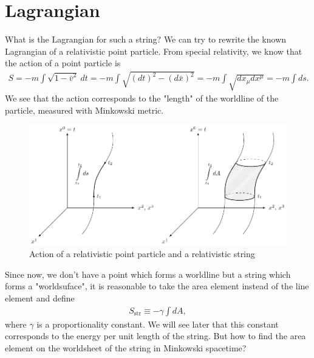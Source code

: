 \section{Lagrangian}
What is the Lagrangian for such a string? 
We can try to rewrite the known Lagrangian of a relativistic point particle.
From special relativity, we know that the action of a point particle is 
\begin{align}
S = - m \int \sqrt{1 - \bar{v}^2} \ dt = - m \int \sqrt{(dt)^2 - (d\bar{x})^2} = - m \int \sqrt{dx_{\mu}dx^{\mu}} = - m \int ds. 
\end{align}
We see that the action corresponds to the "length" of the worldline of the particle, measured with Minkowski metric.
\begin{figure}[H]
\begin{center}
\includegraphics[width=\textwidth]{img/string_action.pdf}
\end{center}
\caption{Action of a relativistic point particle and a relativistic string}
\label{fig:9}
\end{figure}
Since now, we don't have a point which forms a worldline but a string which forms a "worldsuface", it is reasonable to take the area element instead of the line element and define
\begin{align}
S_{\text{str}} \equiv - \gamma \int dA,
\end{align}
where $\gamma$ is a proportionality constant. We will see later that this constant corresponds to the energy per unit length of the string.
But how to find the area element on the worldsheet of the string in Minkowski spacetime? \\

